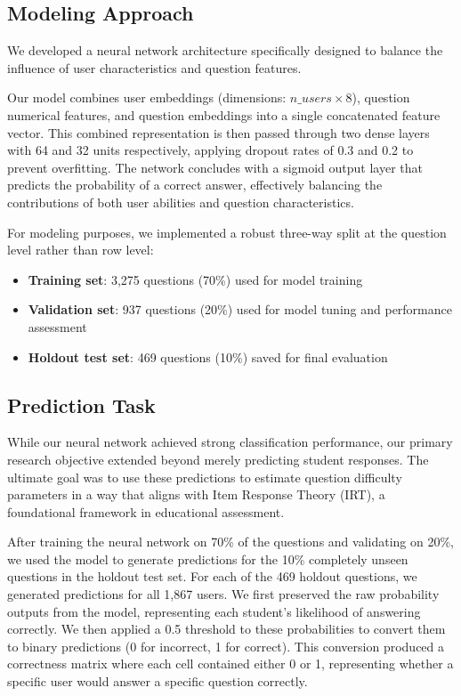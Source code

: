 \documentclass[11pt]{article}
\begin{document}
\subsection{Modeling Approach}

We developed a neural network architecture specifically designed to balance the influence of user characteristics and question features.

Our model combines user embeddings (dimensions: $n\_users \times 8$), question numerical features, and question embeddings into a single concatenated feature vector. This combined representation is then passed through two dense layers with 64 and 32 units respectively, applying dropout rates of 0.3 and 0.2 to prevent overfitting. The network concludes with a sigmoid output layer that predicts the probability of a correct answer, effectively balancing the contributions of both user abilities and question characteristics.

For modeling purposes, we implemented a robust three-way split at the question level rather than row level:

\begin{itemize}
    \item \textbf{Training set}: 3,275 questions (70\%) used for model training
    \item \textbf{Validation set}: 937 questions (20\%) used for model tuning and performance assessment
    \item \textbf{Holdout test set}: 469 questions (10\%) saved for final evaluation
\end{itemize}

\subsection{Prediction Task}

While our neural network achieved strong classification performance, our primary research objective extended beyond merely predicting student responses. The ultimate goal was to use these predictions to estimate question difficulty parameters in a way that aligns with Item Response Theory (IRT), a foundational framework in educational assessment.

After training the neural network on 70\% of the questions and validating on 20\%, we used the model to generate predictions for the 10\% completely unseen questions in the holdout test set. For each of the 469 holdout questions, we generated predictions for all 1,867 users. We first preserved the raw probability outputs from the model, representing each student's likelihood of answering correctly. We then applied a 0.5 threshold to these probabilities to convert them to binary predictions (0 for incorrect, 1 for correct). This conversion produced a correctness matrix where each cell contained either 0 or 1, representing whether a specific user would answer a specific question correctly.
\end{document}
